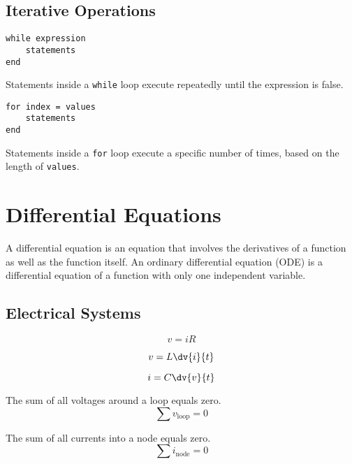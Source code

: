 \documentclass{article}
\begin{document}
\subsection{Iterative Operations}
\begin{multicols}{2}
    \begin{lstlisting}
while expression
    statements
end
    \end{lstlisting}
    \columnbreak
    Statements inside a \lstinline{while} loop execute repeatedly until the expression is false.
\end{multicols}
\begin{multicols}{2}
    \begin{lstlisting}
for index = values
    statements
end
    \end{lstlisting}
    \columnbreak
    Statements inside a \lstinline{for} loop execute a specific number of times, based on the length of \lstinline{values}.
\end{multicols}
\section{Differential Equations}
\begin{definition}
    A differential equation is an equation that involves the derivatives of a function as well as the function itself.
    An ordinary differential equation (ODE) is a differential equation of a function with only one independent variable.
\end{definition}
\subsection{Electrical Systems}
\begin{theorem}
    \begin{equation*}
        v = i R
    \end{equation*}
\end{theorem}
\begin{theorem}
    \begin{equation*}
        v = L \dv{i}{t}
    \end{equation*}
\end{theorem}
\begin{theorem}
    \begin{equation*}
        i = C \dv{v}{t}
    \end{equation*}
\end{theorem}
\begin{theorem}
    The sum of all voltages around a loop equals zero.
    \begin{equation*}
        \sum v_{\mathrm{loop}} = 0
    \end{equation*}
\end{theorem}
\begin{theorem}
    The sum of all currents into a node equals zero.
    \begin{equation*}
        \sum i_{\mathrm{node}} = 0
    \end{equation*}
\end{theorem}
\end{document}
